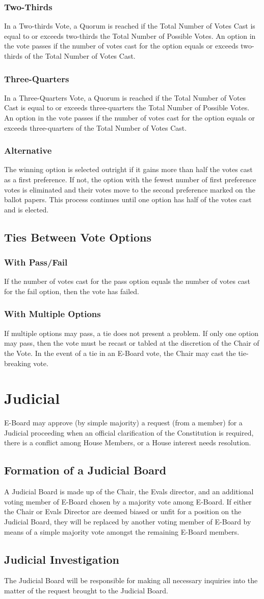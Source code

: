 \documentclass{article}
\newcommand{\article}[1]{\section{#1} \label{#1}}
\newcommand{\asection}[1]{\subsection{#1} \label{#1}}
\newcommand{\asubsection}[1]{\subsubsection{#1} \label{#1}}
\begin{document}
\asubsection{Two-Thirds}
In a Two-thirds Vote, a Quorum is reached if the Total Number of Votes Cast is equal to or exceeds two-thirds the Total Number of Possible Votes.
An option in the vote passes if the number of votes cast for the option equals or exceeds two-thirds of the Total Number of Votes Cast.

\asubsection{Three-Quarters}
In a Three-Quarters Vote, a Quorum is reached if the Total Number of Votes Cast is equal to or exceeds three-quarters the Total Number of Possible Votes.
An option in the vote passes if the number of votes cast for the option equals or exceeds three-quarters of the Total Number of Votes Cast.

\asubsection{Alternative}
The winning option is selected outright if it gains more than half the votes cast as a first preference.
If not, the option with the fewest number of first preference votes is eliminated and their votes move to the second preference marked on the ballot papers.
This process continues until one option has half of the votes cast and is elected.

\asection{Ties Between Vote Options}

\asubsection{With Pass/Fail}
If the number of votes cast for the pass option equals the number of votes cast for the fail option, then the vote has failed.

\asubsection{With Multiple Options}
If multiple options may pass, a tie does not present a problem.
If only one option may pass, then the vote must be recast or tabled at the discretion of the Chair of the Vote.
In the event of a tie in an E-Board vote, the Chair may cast the tie-breaking vote.

\article{Judicial}
E-Board may approve (by simple majority) a request (from a member) for a Judicial proceeding when an official clarification of the Constitution is required, there is a conflict among House Members, or a House interest needs resolution.

\asection{Formation of a Judicial Board}
A Judicial Board is made up of the Chair, the Evals director, and an additional voting member of E-Board chosen by a majority vote among E-Board.
If either the Chair or Evals Director are deemed biased or unfit for a position on the Judicial Board, they will be replaced by another voting member of E-Board by means of a simple majority vote amongst the remaining E-Board members.

\asection{Judicial Investigation}
The Judicial Board will be responsible for making all necessary inquiries into the matter of the request brought to the Judicial Board.
\end{document}
